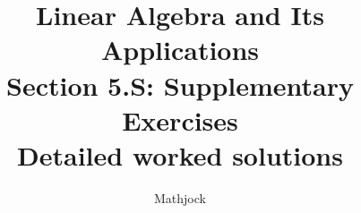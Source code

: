 
\title{\textbf{Linear Algebra and Its Applications}\\[0.3em]Section 5.S: Supplementary Exercises\\[0.3em]\large Detailed worked solutions}
\author{Mathjock}
\date{}

\maketitle
\bookinfo
\tableofcontents
\clearpage
\renewcommand{\thesection}{5.S}
\renewcommand{\theHsection}{5.S}
\setcounter{section}{0}



